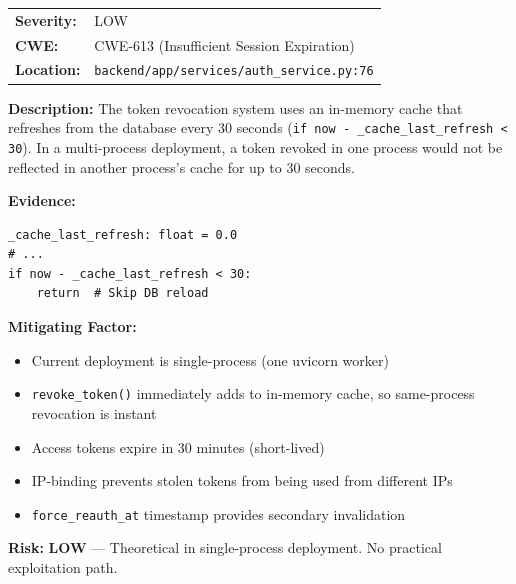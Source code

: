 \documentclass[11pt,a4paper]{article}
\begin{document}
\begin{tcolorbox}[colback=low!5, colframe=low, title=\textbf{S-04: Token Revocation Cache 30-Second Refresh Window}]
\begin{tabularx}{\textwidth}{lX}
\textbf{Severity:} & \textcolor{low}{LOW} \\
\textbf{CWE:} & CWE-613 (Insufficient Session Expiration) \\
\textbf{Location:} & \texttt{backend/app/services/auth\_service.py:76} \\
\end{tabularx}

\textbf{Description:} The token revocation system uses an in-memory cache that refreshes from the database every 30 seconds (\texttt{if now - \_cache\_last\_refresh < 30}). In a multi-process deployment, a token revoked in one process would not be reflected in another process's cache for up to 30 seconds.

\textbf{Evidence:}
\begin{verbatim}
_cache_last_refresh: float = 0.0
# ...
if now - _cache_last_refresh < 30:
    return  # Skip DB reload
\end{verbatim}

\textbf{Mitigating Factor:}
\begin{itemize}[nosep]
  \item Current deployment is single-process (one uvicorn worker)
  \item \texttt{revoke\_token()} immediately adds to in-memory cache, so same-process revocation is instant
  \item Access tokens expire in 30 minutes (short-lived)
  \item IP-binding prevents stolen tokens from being used from different IPs
  \item \texttt{force\_reauth\_at} timestamp provides secondary invalidation
\end{itemize}

\textbf{Risk:} \textcolor{low}{\textbf{LOW}} --- Theoretical in single-process deployment. No practical exploitation path.
\end{tcolorbox}
\end{document}
